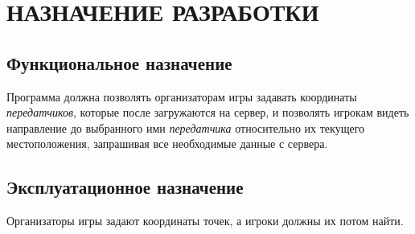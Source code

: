 \section{НАЗНАЧЕНИЕ РАЗРАБОТКИ}

\subsection{Функциональное назначение}

Программа должна позволять организаторам игры задавать координаты \emph{передатчиков}, которые после загружаются на сервер, и позволять игрокам видеть направление до выбранного ими \emph{передатчика} относительно их текущего местоположения, запрашивая все необходимые данные с сервера.

\subsection{Эксплуатационное назначение}
Организаторы игры задают координаты точек, а игроки должны их потом найти.

\clearpage